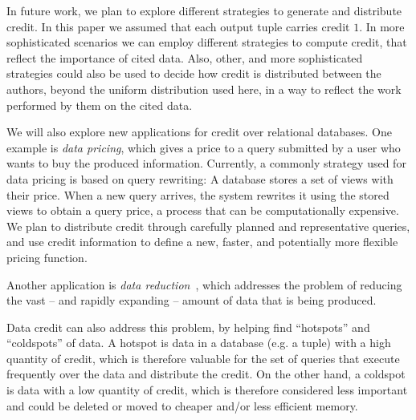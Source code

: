 In future work, we plan to explore different strategies to generate and distribute credit. In this paper we assumed that each output tuple carries credit $1$. In more sophisticated scenarios we can employ different strategies to compute credit, that reflect the importance of cited data.
Also, other, and more sophisticated strategies could also be used to decide how credit is distributed between the authors, beyond the uniform distribution used here, in a way to reflect the work performed by them on the cited data.

We will also explore new applications for credit over relational databases.
One example is \emph{data pricing}, which gives a price to a query submitted by a user who wants to buy the produced information. Currently, a commonly strategy used for data pricing is based on query rewriting:  A database stores a set of views with their price. When a new query arrives, the system rewrites it using the stored views to obtain a query price, a process that can be computationally expensive.
We plan to distribute credit through carefully planned and representative queries, and use credit information to define a new, faster, and potentially more flexible pricing function.

Another application is \emph{data reduction}~\cite{milo2019getting}, which addresses the problem of reducing the vast -- and rapidly expanding -- amount of data that is being produced. %

Data credit can also address this problem, by helping find ``hotspots'' and ``coldspots'' of data. A hotspot is data in a database (e.g. a tuple) with a high quantity of credit, which is therefore valuable for the set of queries that execute frequently over the data and distribute the credit. 
On the other hand, a coldspot is data with a low quantity of credit, which is therefore  considered less  important and could be deleted or moved to cheaper and/or less efficient memory. 

